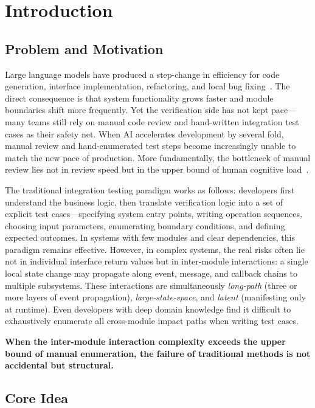 \documentclass[sigconf,nonacm]{acmart}
\begin{document}
\section{Introduction}

\subsection{Problem and Motivation}

Large language models have produced a step-change in efficiency for code generation, interface implementation, refactoring, and local bug fixing~\cite{chen2021codex,peng2023copilot}. The direct consequence is that system functionality grows faster and module boundaries shift more frequently. Yet the verification side has not kept pace---many teams still rely on manual code review and hand-written integration test cases as their safety net. When AI accelerates development by several fold, manual review and hand-enumerated test steps become increasingly unable to match the new pace of production. More fundamentally, the bottleneck of manual review lies not in review speed but in the upper bound of human cognitive load~\cite{fagan1976inspections}.

The traditional integration testing paradigm works as follows: developers first understand the business logic, then translate verification logic into a set of explicit test cases---specifying system entry points, writing operation sequences, choosing input parameters, enumerating boundary conditions, and defining expected outcomes. In systems with few modules and clear dependencies, this paradigm remains effective. However, in complex systems, the real risks often lie not in individual interface return values but in inter-module interactions: a single local state change may propagate along event, message, and callback chains to multiple subsystems. These interactions are simultaneously \emph{long-path} (three or more layers of event propagation), \emph{large-state-space}, and \emph{latent} (manifesting only at runtime). Even developers with deep domain knowledge find it difficult to exhaustively enumerate all cross-module impact paths when writing test cases.

\textbf{When the inter-module interaction complexity exceeds the upper bound of manual enumeration, the failure of traditional methods is not accidental but structural.}

\subsection{Core Idea}
\end{document}
